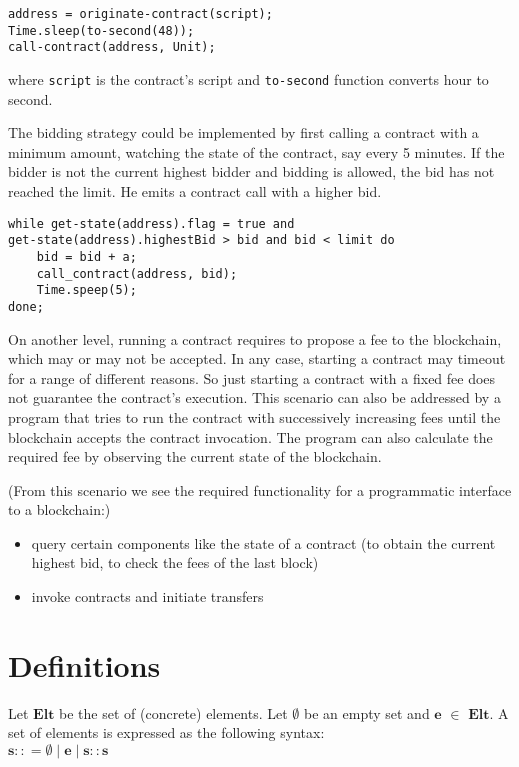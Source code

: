 \documentclass[a4paper]{llncs}
\begin{document}
\begin{lstlisting}[numbers=none]
address = originate-contract(script);
Time.sleep(to-second(48));
call-contract(address, Unit);
\end{lstlisting}
where \texttt{script} is the contract's script and \texttt{to-second} function converts hour to second.

The bidding strategy could be implemented by first calling a contract with a minimum amount, watching the state of the contract, say every 5 minutes. If the bidder is not the current highest bidder and bidding is allowed, the bid has not reached the limit. He emits a contract call with a higher bid.

\begin{lstlisting}[numbers=none]
while get-state(address).flag = true and 
get-state(address).highestBid > bid and bid < limit do
    bid = bid + a;
    call_contract(address, bid); 
    Time.speep(5);
done;
\end{lstlisting}


On another level, running a contract requires to propose a fee to the
blockchain, which may or may not be accepted. In any case, starting a
contract may timeout for a range of different reasons. So just
starting a contract with a fixed fee does not guarantee the contract's execution.
This scenario can also be addressed by a program that tries to run the
contract with successively increasing fees until the blockchain
accepts the contract invocation. The program can also calculate the
required fee by observing the current state of the blockchain.


(From this scenario we see the required functionality for a
programmatic interface to a blockchain:)

\begin{itemize}
\item query certain components like the state of a contract (to obtain
  the current highest bid, to check the fees of the last block)
\item invoke contracts and initiate transfers
\end{itemize}

\section{Definitions}
\begin{definition}%
Let $\mathbf{Elt}$ be the set of (concrete) elements. Let $\emptyset$ be an empty set and $\mathbf{e}$ $\in$  $\mathbf{Elt}$. A set of elements is expressed as the following syntax:
\\
$\mathbf{s} :: = \emptyset \mid \mathbf{e} \mid \mathbf{s :: s}$
\end{definition}
\end{document}
